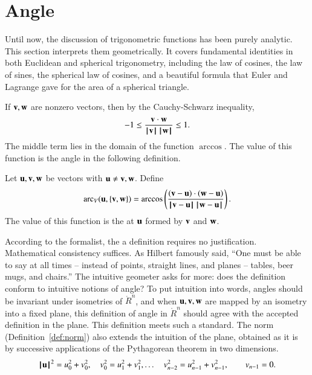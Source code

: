 \section{Angle}\label{sec:angle}

Until now, the discussion of trigonometric functions has been purely
analytic.  This section interprets them geometrically.  It covers
fundamental identities in both Euclidean and spherical trigonometry,
including the law of cosines, the law of sines, the spherical law of
cosines, and a beautiful formula that Euler and Lagrange gave for the area of a spherical triangle.

If ${\mathbf v},{\mathbf w}$ are nonzero vectors, then by the
Cauchy-Schwarz inequality,
\[ -1 \le \frac{{\mathbf v}\cdot {\mathbf w}}{{{\hskip0.1em|\hskip-0.15em|\hskip0.1em}{\mathbf v}{\hskip0.1em|\hskip-0.15em|\hskip0.1em}}\,{{\hskip0.1em|\hskip-0.15em|\hskip0.1em}{\mathbf w}{\hskip0.1em|\hskip-0.15em|\hskip0.1em}}}
  \le 1.\]  The middle term  lies in the
domain of the function $\arccos$. The value of this function is the angle in  the following
definition.  %
%
%

\begin{definition}\label{def:angle}
Let ${\mathbf u},{\mathbf v},{\mathbf w}$ be vectors with ${\mathbf u}\ne {\mathbf v},{\mathbf w}$.
Define 
\[ 
  \arc_V(\u,\{\v,\w\}) = \arccos\left(\frac{(\v-\u)\cdot 
(\w-\u)}{\norm{\v}{\u}\,\norm{\w}{\u}}\right).
\] 
The value of this function is the  at ${\mathbf u}$ formed by
${\mathbf v}$ and ${\mathbf w}$.  %
%
%
%
%
\end{definition}

\begin{tidbit}
  According to the formalist, the a definition requires no
  justification.  Mathematical consistency suffices.  As Hilbert
  famously said, ``One must be able to say at all times -- instead of
  points, straight lines, and planes -- tables, beer mugs, and
  chairs.''  The intuitive geometer asks for more: does the definition
  conform to intuitive notions of angle?  To put intuition into
  words, angles should be invariant under isometries of $\ring{R}^n$,
  and when ${\mathbf u},{\mathbf v},{\mathbf w}$ are mapped by an isometry into a fixed plane,
  this definition of angle in $\ring{R}^n$ should agree with the
  accepted definition in the plane.  This
  definition meets such a standard.  The norm (Definition~\ref{def:norm}) also
  extends the intuition of the plane, obtained as it is by successive
  applications of the Pythagorean theorem in two dimensions.
\[
{{\hskip0.1em|\hskip-0.15em|\hskip0.1em}{\mathbf u}{\hskip0.1em|\hskip-0.15em|\hskip0.1em}}^2 = u_0^2 + v_0^2,\quad v_0^2 = u_1^2 + v_1^2,\ldots
\quad v_{n-2}^2 = u_{n-1}^2 + v_{n-1}^2,\qquad v_{n-1}=0.
\]
\end{tidbit}

